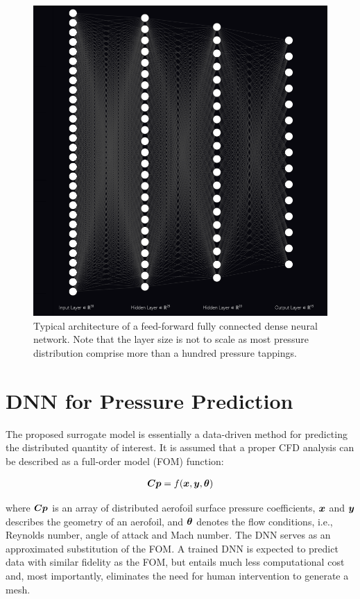 \documentclass[11pt]{article}
\begin{document}
\begin{figure}[htbp]
    \centering
    \includegraphics[scale=0.71]{Architecture.png}
    \caption{Typical architecture of a feed-forward fully connected dense neural network. Note that the layer size is not to scale as most pressure distribution comprise more than a hundred pressure tappings.}
\end{figure}

\section{DNN for Pressure Prediction}

The proposed surrogate model is essentially a data-driven method for predicting the distributed quantity of interest. It is assumed that a proper CFD analysis can be described as a full-order model (FOM) function:

\begin{equation}
	\label{eqn:1}
	\begin{split}
        \hm{Cp} &= f( \hm{x}, \hm{y}, \hm{\theta} ) \\
	\end{split}
\end{equation}

where $\hm{Cp}$ is an array of distributed aerofoil surface pressure coefficients, $\hm{x}$  and $\hm{y}$ describes the geometry of an aerofoil, and $\hm{\theta}$ denotes the flow conditions, i.e., Reynolds number, angle of attack and Mach number. The DNN serves as an approximated substitution of the FOM. A trained DNN is expected to predict data with similar fidelity as the FOM, but entails much less computational cost and, most importantly, eliminates the need for human intervention to generate a mesh.
\end{document}
